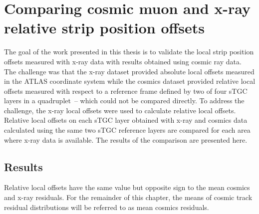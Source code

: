 
\chapter{Comparing cosmic muon and x-ray relative strip position offsets}
\label{chap:comparison}

The goal of the work presented in this thesis is to validate the local strip position offsets measured with x-ray data with results obtained using cosmic ray data. The challenge was that the x-ray dataset provided absolute local offsets measured in the ATLAS coordinate system while the cosmics dataset provided relative local offsets measured with respect to a reference frame defined by two of four sTGC layers in a quadruplet~-- which could not be compared directly. To address the challenge, the x-ray local offsets were used to calculate relative local offsets. Relative local offsets on each sTGC layer obtained with x-ray and cosmics data calculated using the same two sTGC reference layers are compared for each area where x-ray data is available. The results of the comparison are presented here.



\section{Results}
\label{sec:results}

Relative local offsets have the same value but opposite sign to the mean cosmics and x-ray residuals. For the remainder of this chapter, the means of cosmic track residual distributions will be referred to as mean cosmics residuals. 

